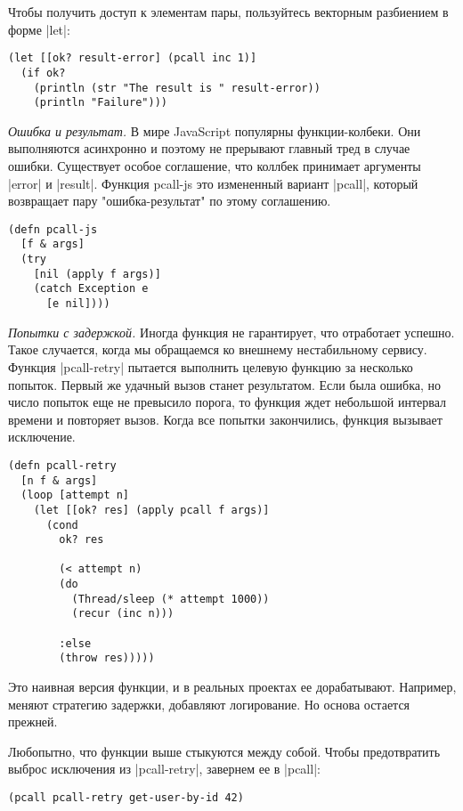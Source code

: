 Чтобы получить доступ к элементам пары, пользуйтесь векторным разбиением в форме
\spverb|let|:

\begin{verbatim}
(let [[ok? result-error] (pcall inc 1)]
  (if ok?
    (println (str "The result is " result-error))
    (println "Failure")))
\end{verbatim}

\emph{Ошибка и результат.} В мире JavaScript популярны функции-колбеки. Они
выполняются асинхронно и поэтому не прерывают главный тред в случае
ошибки. Существует особое соглашение, что коллбек принимает аргументы \spverb|error| и
\spverb|result|. Функция pcall-js это измененный вариант \spverb|pcall|, который возвращает
пару "ошибка-результат" по этому соглашению.

\begin{verbatim}
(defn pcall-js
  [f & args]
  (try
    [nil (apply f args)]
    (catch Exception e
      [e nil])))
\end{verbatim}

\emph{Попытки с задержкой.} Иногда функция не гарантирует, что отработает
успешно. Такое случается, когда мы обращаемся ко внешнему нестабильному
сервису. Функция \spverb|pcall-retry| пытается выполнить целевую функцию за несколько
попыток. Первый же удачный вызов станет результатом. Если была ошибка, но число
попыток еще не превысило порога, то функция ждет небольшой интервал времени и
повторяет вызов. Когда все попытки закончились, функция вызывает исключение.

\begin{verbatim}
(defn pcall-retry
  [n f & args]
  (loop [attempt n]
    (let [[ok? res] (apply pcall f args)]
      (cond
        ok? res

        (< attempt n)
        (do
          (Thread/sleep (* attempt 1000))
          (recur (inc n)))

        :else
        (throw res)))))
\end{verbatim}

Это наивная версия функции, и в реальных проектах ее дорабатывают. Например,
меняют стратегию задержки, добавляют логирование. Но основа остается прежней.

Любопытно, что функции выше стыкуются между собой. Чтобы предотвратить выброс
исключения из \spverb|pcall-retry|, завернем ее в \spverb|pcall|:

\begin{verbatim}
(pcall pcall-retry get-user-by-id 42)
\end{verbatim}


